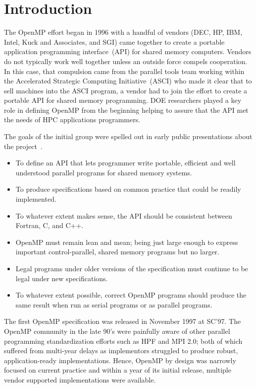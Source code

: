 \section{Introduction}
\label{sec:intro}

The OpenMP effort began in 1996 with a handful of vendors (DEC, HP, IBM, Intel,
Kuck and Associates, and SGI) came together to create a portable application
programming interface~(API) for shared memory computers.  Vendors do not
typically work well together unless an outside force compels cooperation.  In
this case, that compulsion came from the parallel tools team working within the
Accelerated Strategic Computing Initiative~(ASCI) who made it clear that to sell
machines into the ASCI program, a vendor had to join the effort to create a
portable API for shared memory programming.  DOE researchers played a key role
in defining OpenMP from the beginning helping to assure that the API met the
needs of HPC applications programmers.

The goals of the initial group were spelled out in early public presentations
about the project~\cite{ewomp99}.

\begin{itemize}
  \item To define an API that lets programmer write portable, efficient and well
    understood parallel programs for shared memory systems.
  \item To produce specifications based on common practice that could be readily implemented.
  \item To whatever extent makes sense, the API should be consistent between Fortran, C,
    and C++.
  \item OpenMP must remain lean and mean; being just large enough to express important
    control-parallel, shared memory programs  but no larger.
  \item Legal programs under older versions of the specification must continue to be legal
    under new specifications.
  \item To whatever extent possible, correct OpenMP programs should produce the same result
    when run as serial programs or as parallel programs.
\end{itemize}

The first OpenMP specification  was released in November 1997 at SC'97.   The
OpenMP community in the late 90's were painfully aware of other parallel
programming  standardization efforts such as HPF and MPI 2.0; both of which
suffered from multi-year delays as implementors struggled to produce robust,
application-ready implementations.  Hence, OpenMP by design was narrowly
focused on current practice and within a year of its initial release, multiple
vendor supported implementations were available.

